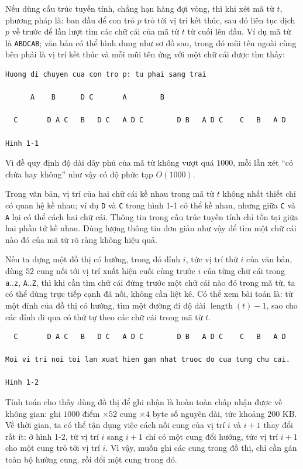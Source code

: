 \documentclass[11pt]{article}
\begin{document}
Nếu dùng cấu trúc tuyến tính, chẳng hạn hàng đợi vòng, thì khi xét mã từ
\(t\), phương pháp là: ban đầu để con trỏ \(p\) trỏ tới vị trí kết thúc, sau
đó liên tục dịch \(p\) về trước để lần lượt tìm các chữ cái của mã từ \(t\)
từ cuối lên đầu. Ví dụ mã từ là \texttt{ABDCAB}; văn bản có thể hình dung như
sơ đồ sau, trong đó mũi tên ngoài cùng bên phải là vị trí kết thúc và mỗi mũi
tên ứng với một chữ cái được tìm thấy:

\begin{verbatim}
Huong di chuyen cua con tro p: tu phai sang trai

      A    B      D C       A        B

  C       D A C   B   D C   A D C        D B   A D C    C   B   A D

Hinh 1-1
\end{verbatim}

Vì đề quy định độ dài dãy phủ của mã từ không vượt quá \(1000\), mỗi lần xét
``có chứa hay không'' như vậy có độ phức tạp \(O(1000)\).

Trong văn bản, vị trí của hai chữ cái kề nhau trong mã từ \(t\) không nhất
thiết chỉ có quan hệ kề nhau; ví dụ \texttt{D} và \texttt{C} trong hình 1-1
có thể kề nhau, nhưng giữa \texttt{C} và \texttt{A} lại có thể cách hai chữ
cái. Thông tin trong cấu trúc tuyến tính chỉ tồn tại giữa hai phần tử kề
nhau. Dùng lượng thông tin đơn giản như vậy để tìm một chữ cái nào đó của mã
từ rõ ràng không hiệu quả.

Nếu ta dựng một đồ thị có hướng, trong đó đỉnh \(i\), tức vị trí thứ \(i\) của
văn bản, dùng \(52\) cung nối tới vị trí xuất hiện cuối cùng trước \(i\) của
từng chữ cái trong \texttt{a}..\texttt{z}, \texttt{A}..\texttt{Z}, thì khi cần
tìm chữ cái đứng trước một chữ cái nào đó trong mã từ, ta có thể dùng trực
tiếp cạnh đã nối, không cần liệt kê. Có thể xem bài toán là: từ một đỉnh của
đồ thị có hướng, tìm một đường đi độ dài \(\operatorname{length}(t)-1\), sao
cho các đỉnh đi qua có thứ tự theo các chữ cái trong mã từ \(t\).

\begin{verbatim}
  C       D A C   B   D C   A D C        D B   A D C    C   B   A D

Moi vi tri noi toi lan xuat hien gan nhat truoc do cua tung chu cai.

Hinh 1-2
\end{verbatim}

Tính toán cho thấy dùng đồ thị để ghi nhận là hoàn toàn chấp nhận được về
không gian: ghi \(1000\) điểm \(\times 52\) cung \(\times 4\) byte số nguyên
dài, tức khoảng \(200\) KB. Về thời gian, ta có thể tận dụng việc cách nối
cung của vị trí \(i\) và \(i+1\) thay đổi rất ít: ở hình 1-2, từ vị trí \(i\)
sang \(i+1\) chỉ có một cung đổi hướng, tức vị trí \(i+1\) cho một cung trỏ
tới vị trí \(i\). Vì vậy, muốn ghi các cung trong đồ thị, chỉ cần gán toàn bộ
hướng cung, rồi đổi một cung trong đó.
\end{document}
